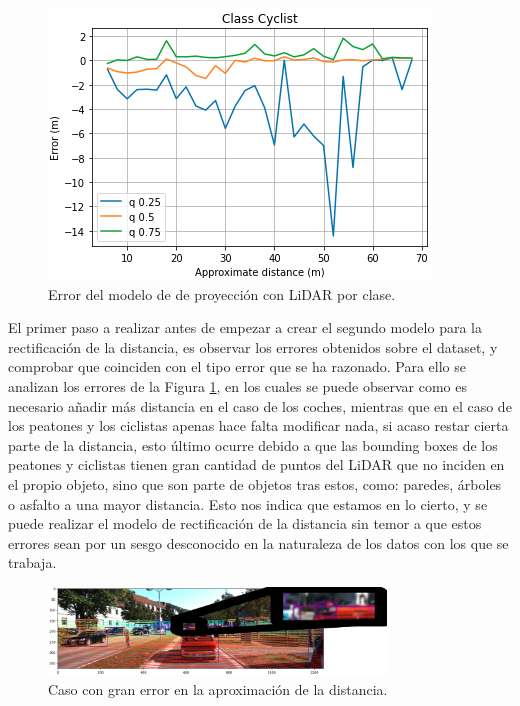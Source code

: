 \begin{figure}[H]
\begin{minipage}{0.32\textwidth}
		\includegraphics[width=1\linewidth]{Book/figures/6_approx_distancia/error_projection_cyclist_kitti3.png}
	\end{minipage}
	\caption{Error del modelo de de proyección con LiDAR por clase.}
	\label{fig:Error del modelo de de proyección con LiDAR por clase.}
\end{figure}

El primer paso a realizar antes de empezar a crear el segundo modelo para la rectificación de la distancia, es observar los errores obtenidos sobre el dataset, y comprobar que coinciden con el tipo error que se ha razonado. Para ello se analizan los errores de la Figura \ref{fig:Error del modelo de de proyección con LiDAR por clase.}, en los cuales se puede observar como es necesario añadir más distancia en el caso de los coches, mientras que en el caso de los peatones y los ciclistas apenas hace falta modificar nada, si acaso restar cierta parte de la distancia, esto último ocurre debido a que las bounding boxes de los peatones y ciclistas tienen gran cantidad de puntos del \ac{LiDAR} que no inciden en el propio objeto, sino que son parte de objetos tras estos, como: paredes, árboles o asfalto a una mayor distancia. Esto nos indica que estamos en lo cierto, y se puede realizar el modelo de rectificación de la distancia sin temor a que estos errores sean por un sesgo desconocido en la naturaleza de los datos con los que se trabaja.

\begin{figure}[H]
    \centering
    \includegraphics[width=0.8\textwidth]{Book/figures/6_approx_distancia/detail_lidar.png}
    \caption{Caso con gran error en la aproximación de la distancia.}
    \label{fig:Caso con gran error en la aproximación de la distancia.}
\end{figure}

